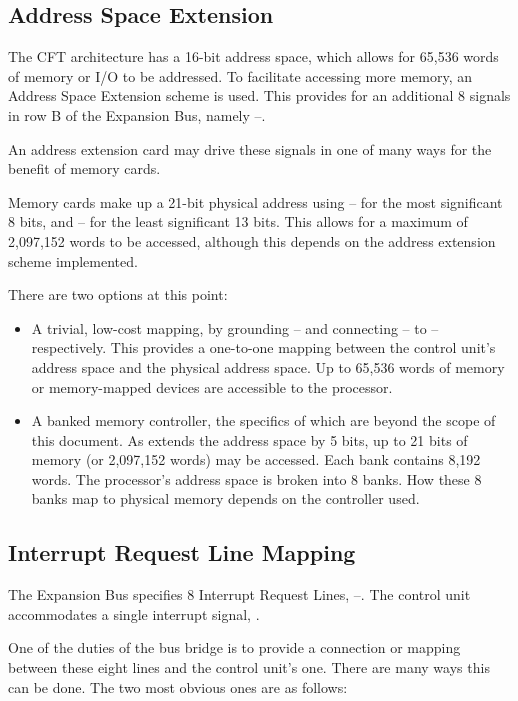 \subsection{Address Space Extension}

The CFT architecture has a 16-bit address space, which allows for
65,536 words of memory or I/O to be addressed. To facilitate accessing
more memory, an Address Space Extension scheme is used. This provides
for an additional 8 signals in row B of the Expansion Bus, namely
–.

An address extension card may drive these signals in one of many ways
for the benefit of memory cards.

Memory cards make up a 21-bit physical address using
– for the most significant 8 bits, and
– for the least significant 13 bits. This allows
for a maximum of 2,097,152 words to be accessed, although this depends
on the address extension scheme implemented.

There are two options at this point:

\begin{itemize}
\item A trivial, low-cost mapping, by grounding –
  and connecting – to –
  respectively. This provides a one-to-one mapping between the control
  unit's address space and the physical address space. Up to 65,536
  words of memory or memory-mapped devices are accessible to the
  processor.
\item A banked memory controller, the specifics of which are beyond
  the scope of this document. As \AEXTn{} extends the address space by
  5 bits, up to 21 bits of memory (or 2,097,152 words) may be
  accessed. Each bank contains 8,192 words. The processor's address
  space is broken into 8 banks. How these 8 banks map to physical
  memory depends on the controller used.
\end{itemize}

\subsection{Interrupt Request Line Mapping}

The Expansion Bus specifies 8 Interrupt Request Lines,
–. The control unit accommodates a single interrupt
signal, \IRQ.

One of the duties of the bus bridge is to provide a connection or
mapping between these eight lines and the control unit's one. There
are many ways this can be done. The two most obvious ones are as follows:

